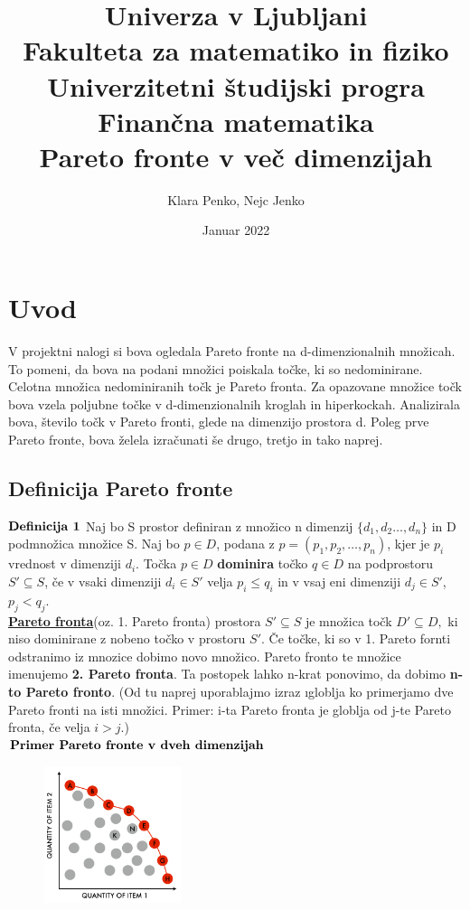 \documentclass{article}
\title{
{\large{Univerza v Ljubljani}}\\ 
{\large{Fakulteta za matematiko in fiziko}}\\ 
{\large{Univerzitetni študijski progra Finančna matematika}}\\ 
\vspace{5cm}
{\textbf{Pareto fronte v več dimenzijah}
\vspace{5cm}}
}
\author{Klara Penko, Nejc Jenko}
\date{Januar 2022}
\begin{document}
\begin{titlepage}
    \maketitle
\end{titlepage}

\tableofcontents

\break

\section{Uvod}
V projektni nalogi si bova ogledala Pareto fronte na d-dimenzionalnih množicah. To pomeni, da bova na podani množici poiskala točke, ki so nedominirane. Celotna množica nedominiranih točk je Pareto fronta.  Za opazovane množice točk bova vzela poljubne točke v d-dimenzionalnih kroglah in hiperkockah. Analizirala bova, število točk v Pareto fronti, glede na dimenzijo prostora d. Poleg prve Pareto fronte, bova želela izračunati še drugo, tretjo in tako naprej.


\subsection{Definicija Pareto fronte}
${\rm \textbf{Definicija 1}}$ Naj bo S prostor definiran z množico n dimenzij $\{d_{1},d_{2}\dots,d_{n}\}$ in D podmnožica množice S. Naj bo $p \in D$, podana z $p = (p_{1},p_{2},\dots,p_{n})$, kjer je $p_{i}$ vrednost v dimenziji $d_{i}$. Točka $p \in D$ \textbf{dominira} točko $q \in D$ na podprostoru $S'\subseteq S$, če v vsaki dimenziji $d_{i} \in S'$ velja $p_{i} \le q_{i}$ in v vsaj eni dimenziji $d_{j} \in S'$, $p_{j} < q_{j}$. \\
\underline{\textbf{Pareto fronta}}(oz. 1. Pareto fronta) prostora $S' \subseteq S$ je množica točk $D' \subseteq D,$ ki niso dominirane z nobeno točko v prostoru $S'$. Če točke, ki so v 1. Pareto fornti odstranimo iz mnozice dobimo novo množico. Pareto fronto te množice imenujemo \textbf{2. Pareto fronta}. Ta postopek lahko n-krat ponovimo, da dobimo \textbf{n-to Pareto fronto}.
(Od tu naprej uporablajmo izraz \i{globlja} ko primerjamo dve Pareto fronti na isti množici. Primer: i-ta Pareto fronta je globlja od j-te Pareto fronta, če velja $i > j$.)
\\

${\rm \textbf{Primer Pareto fronte v dveh dimenzijah}}$

\begin{figure}[htbp]
\includegraphics[width=4cm]{Slike/Slika_pareto_fronta.png}
\centering
\end{figure}
\end{document}
